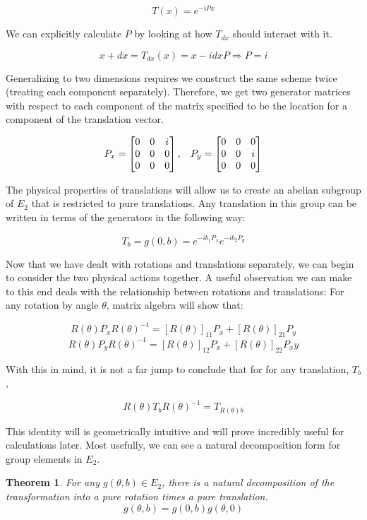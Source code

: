 \documentclass[10pt]{ucthesis}
\newtheorem{theorem}[definition]{Theorem}
\begin{document}
$$T(x) = e^{-iPx}$$

We can explicitly calculate $P$ by looking at how $T_{dx}$ should interact with it.

$$x + dx = T_{dx}(x) = x -idx  P \Rightarrow P = i$$

Generalizing to two dimensions requires we construct the same scheme twice (treating each component separately). Therefore, we get two generator matrices with respect to each component of the matrix specified to be the location for a component of the translation vector.

$$P_x = \begin{bmatrix}
			0 & 0 & i\\
			0 & 0 & 0 \\
			0 & 0 & 0
		\end{bmatrix}, \hspace{3mm}P_y = \begin{bmatrix}
			0 & 0 & 0\\
			0 & 0 & i \\
			0 & 0 & 0
		\end{bmatrix}$$

The physical properties of translations will allow us to create an abelian subgroup of $E_2$ that is restricted to pure translations. Any translation in this group can be written in terms of the generators in the following way:

$$T_b = g(0,b) = e^{-ib_1P_x}e^{-ib_2P_y}$$

Now that we have dealt with rotations and translations separately, we can begin to consider the two physical actions together. A useful observation we can make to this end deals with the relationship between rotations and translations: For any rotation by angle $\theta$, matrix algebra will show that:

$$R(\theta)P_xR(\theta)^{-1} = [R(\theta)]_{11}P_x +  [R(\theta)]_{21}P_y$$
$$R(\theta)P_yR(\theta)^{-1} = [R(\theta)]_{12}P_x +  [R(\theta)]_{22}P_xy$$

With this in mind, it is not a far jump to conclude that for for any translation, $T_b$,

$$R(\theta)T_bR(\theta)^{-1} = T_{R(\theta)b}$$

This identity will is geometrically intuitive and will prove incredibly useful for calculations later. Most usefully, we can see a natural decomposition form for group elements in $E_2$.

\begin{theorem}
	For any $g(\theta,b)\in E_2$, there is a natural decomposition of the transformation into a pure rotation times a pure translation.
$$g(\theta,b) = g(0,b)g(\theta,0)$$
\end{theorem}
\end{document}
